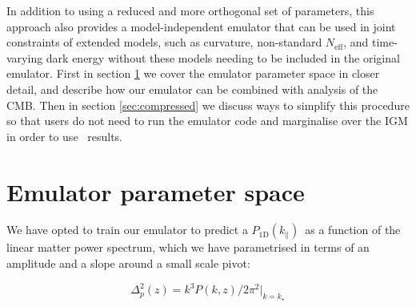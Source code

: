 \documentclass[preprintnumbers,prd,superscriptaddress,notitlepage,nofootinbib] {revtex4-1}
\def\afrhid#1{}
\newcommand{\fluxpower}{$P_\mathrm{1D}(k_\parallel)$}
\newcommand\LCDM{$\Lambda$CDM}
\begin{document}
In addition to using a reduced and more orthogonal set of parameters, this approach also
provides a model-independent emulator that can be used in joint constraints of
extended models, such as curvature, non-standard $N_\mathrm{eff}$, and time-varying
dark energy without these models needing to be included in the original emulator.
First in section \ref{sec:emu_space} we cover the emulator parameter space in closer
detail, and describe how our emulator can be combined with analysis of the CMB.
Then in section \ref{sec:compressed} we discuss ways to simplify this procedure
so that users do not need to run the emulator code and marginalise over the IGM
in order to use \lyaf\ results.

\afrhid{In my opinion, there are two different discussions that we should not mix:
\begin{itemize}
 \item (A) Why the emulator works with linear power parameters instead of working with cosmological parameters.
 \item (B) Why do we want to present a marginalised likelihood in terms of linear power parameters (in velocity units).
 \end{itemize}
There are different motivations for (A), but I think the most important one is that this allows us to run cosmological analyses in non-\LCDM\ models, even if the emulator was constructed using only \LCDM\ simulations. I'm thinking of the usual extensions that people discuss, like open curvature, non-zero neutrino masses, $w$CDM models, and so on. 
It would be really hard to train an emulator that had all these parameters as labels.
For (B), the motivation is so that we can provide a light-weight and fast likelihood module that
others can use.
However, it is important to differentiate (A) from (B), since if we didn't want to provide any
marginalised / compressed likelihood, we would still want the emulator to work with linear
power parameters.}



\section{Emulator parameter space}
\label{sec:emu_space}
We have opted to train our emulator to predict a \fluxpower\ as
a function of the linear matter power spectrum, which we have parametrised in
terms of an amplitude and a slope around a small scale pivot:

\begin{equation}
    \label{eq:Delta2_p}
    \Delta^2_p(z)=k^3P(k, z)/2\pi^2|_{k=k_\star}
\end{equation}
\end{document}
